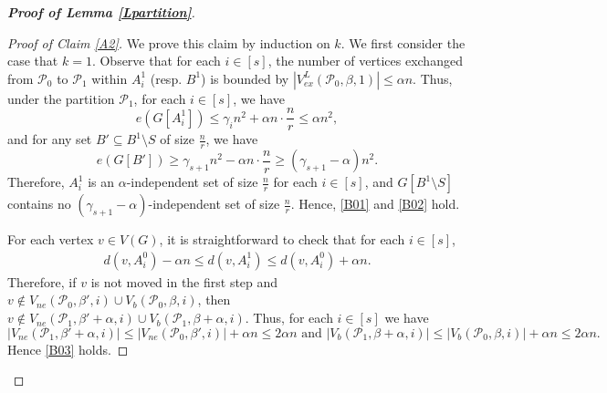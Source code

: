 \documentclass[11pt, a4paper]{article}
\theoremstyle{definition}
\newcommand{\<}{\subseteq}
\begin{document}
\begin{proof}[\bf Proof of Lemma \ref{Lpartition}]
\begin{proof}[Proof of Claim \ref{A2}]
We prove this claim by induction on $k$. We first consider the case that $k=1$. Observe that for each $i\in [s]$, the number of vertices exchanged from $\mathcal{P}_0$ to $\mathcal{P}_1$ within $A_i^1$ (resp. $B^1$) is bounded by $|V_{ex}^L(\mathcal{P}_0,\beta,1)|\le  \alpha n$. Thus, under the partition $\mathcal{P}_1$, for each $i\in[s]$, we have %
$$
e(G[A_i^1])\leq \gamma_in^2+\alpha n \cdot \frac{n}{r}\le \alpha n^2,
$$
and for any set $B'\subseteq B^1\setminus S$ of  size $\frac{n}{r}$, we have 
$$
e(G[B'])\ge \gamma_{s+1} n^2-\alpha n\cdot \frac{n}{r}\geq (\gamma_{s+1}-\alpha)n^2.
$$
Therefore, $A_i^1$ is an $\alpha$-independent set of size $\frac{n}{r}$ for each $i\in [s]$,  and $G[B^1\setminus S]$  contains no  $(\gamma_{s+1}-\alpha)$-independent set of size $\frac{n}{r}$. Hence, \ref{B01} and \ref{B02} hold. %

For each vertex $v \in V(G)$, it is straightforward to check that for each $i\in [s]$, 
\begin{align}\label{DV}
    d(v,A_i^0)-\alpha n \le d(v,A_i^1)\le  d(v,A_i^0)+\alpha n.
\end{align}
Therefore, if $v$ is not moved in the first step and $v\notin V_{ne}(\mathcal{P}_0,\beta',i)\cup V_{b}(\mathcal{P}_0,\beta,i)$, then %
$v\notin V_{ne}(\mathcal{P}_1,\beta'+\alpha,i)\cup V_{b}(\mathcal{P}_1,\beta+\alpha,i)$. %
Thus, for each $i\in [s]$ we have 
$$|V_{ne}(\mathcal{P}_1,\beta'+\alpha, i)|\le |V_{ne}(\mathcal{P}_0,\beta',i)|+\alpha n \le 2\alpha n
\text{~and~} |V_{b}(\mathcal{P}_1,\beta+\alpha,i)|\le |V_{b}(\mathcal{P}_0,\beta,i)|+\alpha n \le 2\alpha n.$$
Hence \ref{B03} holds. 


\end{proof}
\end{proof}
\end{document}
